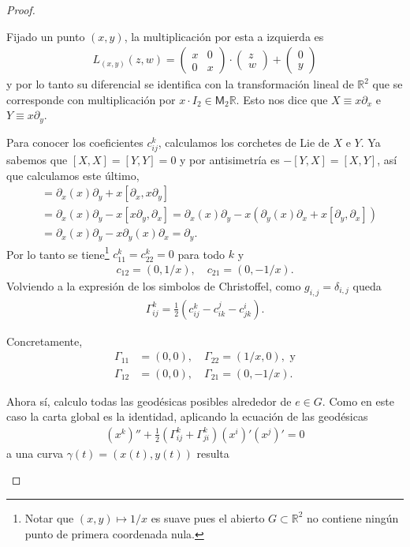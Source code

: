 \documentclass[11pt]{article}
\newcommand{\R}{\mathbb{R}}
\newcommand{\M}[2]{\mathsf{M}_{#1}#2}
\begin{document}
\begin{proof}
\begin{itemize}[listparindent = \parindent]
Fijado un punto $(x,y)$, la multiplicación por esta a izquierda es
\begin{align*}
L_{(x,y)}(z,w) = \begin{pmatrix}
x & 0\\
0 & x
\end{pmatrix}\cdot \begin{pmatrix}
z\\
w
\end{pmatrix}  + \begin{pmatrix}
0\\y
\end{pmatrix}
\end{align*}
y por lo tanto su diferencial se identifica con la transformación lineal de $\R^2$ que se corresponde con multiplicación por $x \cdot I_2 \in \M{2}{\R}$. Esto nos dice que $X \equiv x \partial_x$ e $Y \equiv x\partial_y$. 

Para conocer los coeficientes $c_{ij}^k$, calculamos los corchetes de Lie de $X$ e $Y$. Ya sabemos que $[X,X] = [Y,Y] = 0$ y por antisimetría es $-[Y,X] = [X,Y]$, así que calculamos este último,
\begin{align*}
[x\partial_x,x\partial_y] &= \partial_x(x)\partial_y + x[\partial_x,x\partial_y]\\
&= \partial_x(x)\partial_y - x[x\partial_y,\partial_x] = \partial_x(x)\partial_y -x\left(\partial_y(x)\partial_x + x[\partial_y,\partial_x]\right)\\
&= \partial_x(x)\partial_y -x\partial_y(x)\partial_x = \partial_y.
\end{align*}
\newpage
Por lo tanto se tiene\footnote{Notar que $(x,y) \mapsto 1/x$ es suave pues el abierto $G \subset \R^2$ no contiene ningún punto de primera coordenada nula.} $c_{11}^k = c_{22}^k = 0$ para todo $k$ y
\begin{align*}
c_{12} = (0,1/x), \quad c_{21} = (0,-1/x).
\end{align*} 
Volviendo a la expresión de los simbolos de Christoffel, como $g_{i,j} = \delta_{i,j}$ queda
\begin{align*}
\Gamma_{ij}^k = \frac{1}{2}(c^k_{ij}-c^j_{ik}-c^i_{jk}).
\end{align*}

Concretamente,
\begin{align*}
\Gamma_{11} &= (0,0), \quad
\Gamma_{22} = (1/x,0), \text{ y}\\
\Gamma_{12} &= (0,0), \quad
\Gamma_{21} = (0,-1/x).
\end{align*}

Ahora sí, calculo todas las geodésicas posibles alrededor de $e \in G$. Como en este caso la carta global es la identidad, aplicando la ecuación de las geodésicas 
\begin{align*}
(x^k)'' + \frac{1}{2}(\Gamma_{ij}^k + \Gamma_{ji}^k)(x^i)'(x^j)' = 0
\end{align*}
a una curva $\gamma(t) = (x(t),y(t))$ resulta


\end{itemize}
\end{proof}
\end{document}
